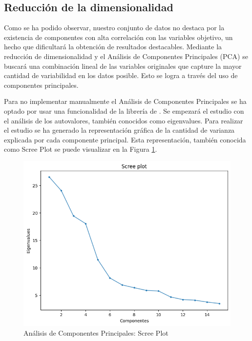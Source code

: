 \subsection{Reducción de la dimensionalidad}

Como se ha podido observar, nuestro conjunto de datos no destaca por la existencia de componentes con alta correlación con las variables objetivo, un hecho que dificultará la obtención de resultados destacables. Mediante la reducción de dimensionalidad y el Análisis de Componentes Principales (PCA) se buscará una combinación lineal de las variables originales que capture la mayor cantidad de variabilidad en los datos posible. Esto se logra a través del uso de componentes principales.
\newline

Para no implementar manualmente el Análisis de Componentes Principales se ha optado por usar una funcionalidad de la librería de \cite{Scikit-learn}. Se empezará el estudio con el análisis de los autovalores, también conocidos como eigenvalues. Para realizar el estudio se ha generado la representación gráfica de la cantidad de varianza explicada por cada componente principal. Esta representación, también conocida como Scree Plot se puede visualizar en la Figura \ref{Conjunto-Datos-Scree-Plot}.

\begin{figure}[H]
    \centering
    \includegraphics[width=\smallSize]{images/screePlot.png}
    \caption{Análisis de Componentes Principales: Scree Plot}
    \label{Conjunto-Datos-Scree-Plot}
\end{figure}

